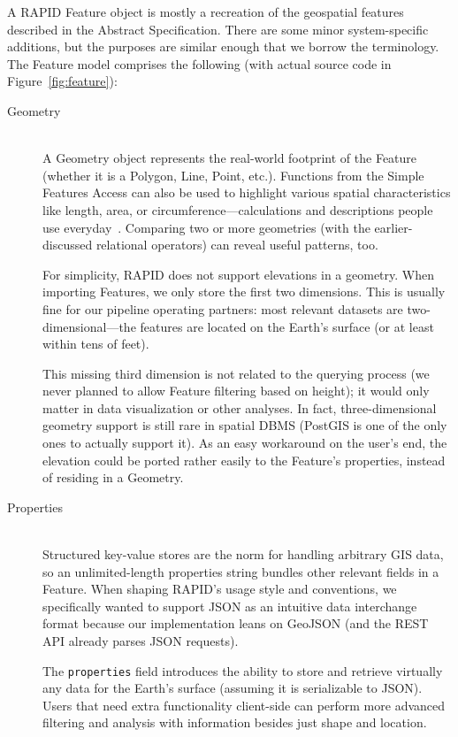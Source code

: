 A RAPID Feature object is mostly a recreation of the geospatial features described in the Abstract Specification. There are some minor system-specific additions, but the purposes are similar enough that we borrow the terminology. The Feature model comprises the following (with actual source code in Figure~\ref{fig:feature}):

\begin{description}
  \item[Geometry] \hfill \\
  A Geometry object represents the real-world footprint of the Feature (whether it is a Polygon, Line, Point, etc.). Functions from the Simple Features Access can also be used to highlight various spatial characteristics like length, area, or circumference---calculations and descriptions people use everyday~\cite{SFA}. Comparing two or more geometries (with the earlier-discussed relational operators) can reveal useful patterns, too.
   
   For simplicity, RAPID does not support elevations in a geometry. When importing Features, we only store the first two dimensions. This is usually fine for our pipeline operating partners: most relevant datasets are two-dimensional---the features are located on the Earth's surface (or at least within tens of feet).
   
   This missing third dimension is not related to the querying process (we never planned to allow Feature filtering based on height); it would only matter in data visualization or other analyses. In fact, three-dimensional geometry support is still rare in spatial DBMS (PostGIS is one of the only ones to actually support it). As an easy workaround on the user's end, the elevation could be ported rather easily to the Feature's properties, instead of residing in a Geometry.
  
  \item[Properties] \hfill \\
  Structured key-value stores are the norm for handling arbitrary GIS data, so an unlimited-length properties string bundles other relevant fields in a Feature. When shaping RAPID's usage style and conventions, we specifically wanted to support JSON as an intuitive data interchange format because our implementation leans on GeoJSON (and the REST API already parses JSON requests).
  
  The \texttt{properties} field introduces the ability to store and retrieve virtually any data for the Earth's surface (assuming it is serializable to JSON). Users that need extra functionality client-side can perform more advanced filtering and analysis with information besides just shape and location.
  

\end{description}
